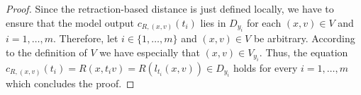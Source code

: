 \documentclass[10pt,a4paper]{amsart}
\begin{document}
\begin{proof}
	Since the retraction-based distance is just defined locally, we have to ensure that the model output $c_{R, (x, v)}(t_i)$ lies in $D_{y_i}$ for each $(x, v)\in V$ and $i=1, \ldots, m$. Therefore, let $i\in\{1, \ldots, m\}$ and $(x, v)\in V$ be arbitrary. According to the definition of $V$ we have especially that $(x,v)\in V_{y_i}$. Thus, the equation $c_{R, (x, v)}(t_i) = R(x, t_iv) = R\left(l_{t_i}(x, v)\right)\in D_{y_i}$ holds for every $i= 1, \ldots, m$ which concludes the proof. 
\end{proof}
\end{document}
